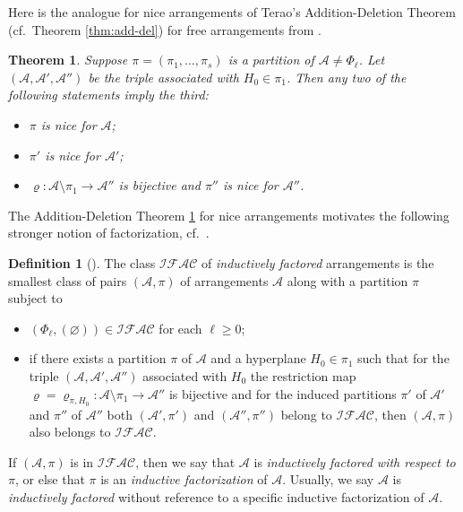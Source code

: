 \documentclass[12pt]{amsart}
\newcommand\CA{{\mathscr A}}
\newcommand\CIFAC{{\mathcal {IF\!AC}}}
\newcommand\R{{\varrho}}
\numberwithin{equation}{section}
\theoremstyle{plain}
\newtheorem{theorem}[equation]{Theorem}
\theoremstyle{definition}
\newtheorem{defn}[equation]{Definition}
\begin{document}
Here is the analogue for nice arrangements of Terao's
Addition-Deletion Theorem (cf.~Theorem \ref{thm:add-del}) for free arrangements from
\cite{hogeroehrle:factored}.

\begin{theorem}
	\label{thm:add-del-factored}
	Suppose
	$\pi = (\pi_1, \ldots, \pi_s)$ is a  partition  of $\CA  \ne \Phi_\ell$.
	Let %
	$(\CA, \CA', \CA'')$ be the triple associated with $H_0  \in \pi_1$.
	Then any two of the following statements imply the third:
	\begin{itemize}
		\item[(i)] $\pi$ is nice for $\CA$;
		\item[(ii)] $\pi'$ is nice for $\CA'$;
		\item[(iii)] $\R: \CA \setminus \pi_1 \to \CA''$
		is bijective and $\pi''$ is nice for $\CA''$.
	\end{itemize}
\end{theorem}

The Addition-Deletion Theorem \ref{thm:add-del-factored}
for nice arrangements motivates
the following stronger notion of factorization,
cf.\ \cite{jambuparis:factored}.

\begin{defn} [{\cite[Def.~3.8]{hogeroehrle:factored}}]
	\label{def:indfactored}
	The class $\CIFAC$ of \emph{inductively factored} arrangements
	is the smallest class of pairs $(\CA, \pi)$ of
	arrangements $\CA$ along with a partition $\pi$
	subject to
	\begin{itemize}
		\item[(i)] $(\Phi_\ell, (\varnothing)) \in \CIFAC$ for each $\ell \ge 0$;
		\item[(ii)] if there exists a partition $\pi$ of $\CA$
		and a hyperplane $H_0 \in \pi_1$ such that
		for the triple $(\CA, \CA', \CA'')$ associated with $H_0$
		the restriction map $\R = \R_{\pi, H_0} : \CA \setminus \pi_1 \to \CA''$
		is bijective and for the induced partitions $\pi'$ of $\CA'$ and
		$\pi''$ of $\CA''$
		both $(\CA', \pi')$ and $(\CA'', \pi'')$ belong to $\CIFAC$,
		then $(\CA, \pi)$ also belongs to $\CIFAC$.
	\end{itemize}
	If $(\CA, \pi)$ is in $\CIFAC$, then we say that
	$\CA$ is \emph{inductively factored with respect to $\pi$}, or else
	that $\pi$ is an \emph{inductive factorization} of $\CA$.
	Usually, we say $\CA$ is \emph{inductively factored} without
	reference to a specific inductive factorization of $\CA$.
\end{defn}
\end{document}
